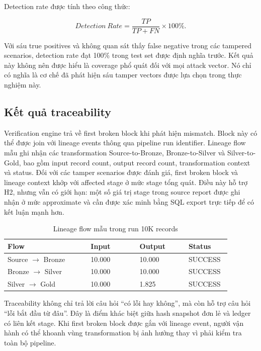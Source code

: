 Detection rate được tính theo công thức:

\begin{equation}
Detection\ Rate = \frac{TP}{TP + FN} \times 100\%.
\end{equation}

Với sáu true positives và không quan sát thấy false negative trong các tampered scenarios, detection rate đạt 100\% trong test set được định nghĩa trước. Kết quả này không nên được hiểu là coverage phổ quát đối với mọi attack vector. Nó chỉ có nghĩa là cơ chế đã phát hiện sáu tamper vectors được lựa chọn trong thực nghiệm này.

\subsection{Kết quả traceability}

Verification engine trả về first broken block khi phát hiện mismatch. Block này có thể được join với lineage events thông qua pipeline run identifier. Lineage flow mẫu ghi nhận các transformation Source-to-Bronze, Bronze-to-Silver và Silver-to-Gold, bao gồm input record count, output record count, transformation context và status. Đối với các tamper scenarios được đánh giá, first broken block và lineage context khớp với affected stage ở mức stage tổng quát. Điều này hỗ trợ H2, nhưng vẫn có giới hạn: một số giá trị stage trong source report được ghi nhận ở mức approximate và cần được xác minh bằng SQL export trực tiếp để có kết luận mạnh hơn.

\begin{table}[t]
\caption{Lineage flow mẫu trong run 10K records}
\centering
\begin{tabular}{p{0.34\linewidth}p{0.20\linewidth}p{0.20\linewidth}p{0.14\linewidth}}
\toprule
\textbf{Flow} & \textbf{Input} & \textbf{Output} & \textbf{Status} \\
\midrule
Source $\rightarrow$ Bronze & 10.000 & 10.000 & SUCCESS \\
Bronze $\rightarrow$ Silver & 10.000 & 10.000 & SUCCESS \\
Silver $\rightarrow$ Gold & 10.000 & 1.825 & SUCCESS \\
\bottomrule
\end{tabular}
\label{tab:lineage}
\end{table}

Traceability không chỉ trả lời câu hỏi ``có lỗi hay không'', mà còn hỗ trợ câu hỏi ``lỗi bắt đầu từ đâu''. Đây là điểm khác biệt giữa hash snapshot đơn lẻ và ledger có liên kết stage. Khi first broken block được gắn với lineage event, người vận hành có thể khoanh vùng transformation bị ảnh hưởng thay vì phải kiểm tra toàn bộ pipeline.

